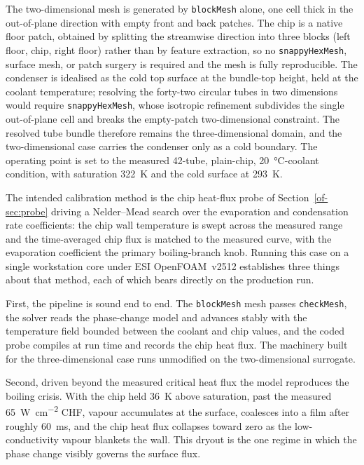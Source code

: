 \documentclass[11pt]{article}
\begin{document}
The two-dimensional mesh is generated by \texttt{blockMesh} alone, one cell thick in the
out-of-plane direction with empty front and back patches. The chip is a native floor patch,
obtained by splitting the streamwise direction into three blocks (left floor, chip, right
floor) rather than by feature extraction, so no \texttt{snappyHexMesh}, surface mesh, or
patch surgery is required and the mesh is fully reproducible. The condenser is idealised as
the cold top surface at the bundle-top height, held at the coolant temperature; resolving the
forty-two circular tubes in two dimensions would require \texttt{snappyHexMesh}, whose
isotropic refinement subdivides the single out-of-plane cell and breaks the empty-patch
two-dimensional constraint. The resolved tube bundle therefore remains the three-dimensional
domain, and the two-dimensional case carries the condenser only as a cold boundary. The
operating point is set to the measured 42-tube, plain-chip, \SI{20}{\celsius}-coolant
condition, with saturation \SI{322}{\kelvin} and the cold surface at \SI{293}{\kelvin}.

The intended calibration method is the chip heat-flux probe of Section~\ref{of-sec:probe} driving
a Nelder--Mead search over the evaporation and condensation rate coefficients: the chip wall
temperature is swept across the measured range and the time-averaged chip flux is matched to the
measured curve, with the evaporation coefficient the primary boiling-branch knob. Running this
case on a single workstation core under ESI OpenFOAM~v2512 establishes three things about that
method, each of which bears directly on the production run.

First, the pipeline is sound end to end. The \texttt{blockMesh} mesh passes \texttt{checkMesh},
the solver reads the phase-change model and advances stably with the temperature field bounded
between the coolant and chip values, and the coded probe compiles at run time and records the
chip heat flux. The machinery built for the three-dimensional case runs unmodified on the
two-dimensional surrogate.

Second, driven beyond the measured critical heat flux the model reproduces the boiling crisis.
With the chip held \SI{36}{\kelvin} above saturation, past the measured
\SI{65}{\watt\per\centi\meter\squared} CHF, vapour accumulates at the surface, coalesces into a
film after roughly \SI{60}{\milli\second}, and the chip heat flux collapses toward zero as the
low-conductivity vapour blankets the wall. This dryout is the one regime in which the phase
change visibly governs the surface flux.
\end{document}
